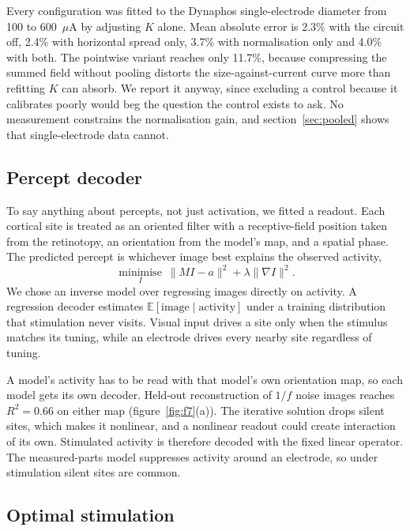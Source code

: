 \documentclass[10pt,twocolumn]{article}
\newcommand{\uA}{\ensuremath{\mu\text{A}}}
\begin{document}
Every configuration was fitted to the Dynaphos single-electrode diameter
from 100 to 600~\uA{} by adjusting $K$ alone. Mean absolute error is
2.3\% with the circuit off, 2.4\% with horizontal spread only, 3.7\% with
normalisation only and 4.0\% with both. The pointwise variant reaches only
11.7\%, because compressing the summed field without pooling distorts the
size-against-current curve more than refitting $K$ can absorb. We report
it anyway, since excluding a control because it calibrates poorly would beg
the question the control exists to ask. No measurement constrains the
normalisation gain, and section~\ref{sec:pooled} shows that
single-electrode data cannot.

\subsection{Percept decoder}

To say anything about percepts, not just activation, we fitted a readout.
Each cortical site is treated as an oriented filter with a receptive-field
position taken from the retinotopy, an orientation from the model's map,
and a spatial phase. The predicted percept is whichever image best explains
the observed activity,
\begin{equation}
  \operatorname*{minimise}_{I}\ \lVert MI - a\rVert^2 + \lambda\lVert\nabla I\rVert^2.
\end{equation}
We chose an inverse model over regressing images directly on activity. A
regression decoder estimates $\mathbb{E}[\text{image}\mid\text{activity}]$
under a training distribution that stimulation never visits. Visual input
drives a site only when the stimulus matches its tuning, while an electrode
drives every nearby site regardless of tuning.

A model's activity has to be read with that model's own orientation map,
so each model gets its own decoder. Held-out reconstruction of $1/f$ noise
images reaches $R^2 = 0.66$ on either map (figure~\ref{fig:f7}(a)). The
iterative solution drops silent sites, which makes it nonlinear, and a
nonlinear readout could create interaction of its own. Stimulated activity
is therefore decoded with the fixed linear operator. The measured-parts
model suppresses activity around an electrode, so under stimulation
silent sites are common.

\subsection{Optimal stimulation}
\label{sec:encmethods}
\end{document}
